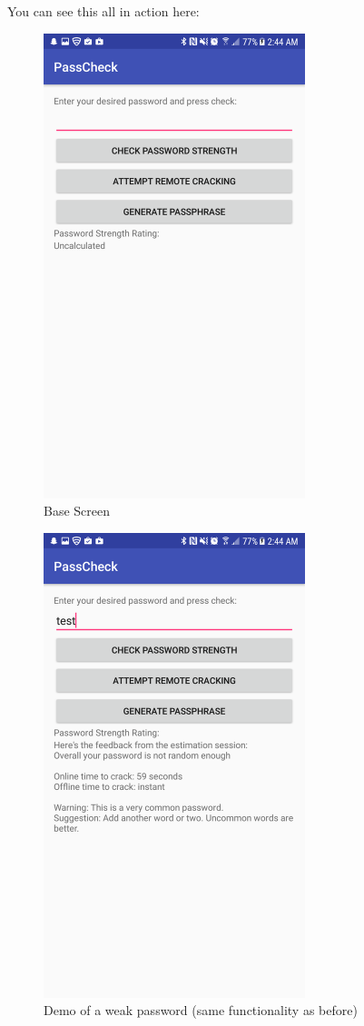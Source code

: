 \documentclass{article}
\begin{document}
You can see this all in action here:
\begin{figure}[ht]
      \includegraphics[width=3in]{img/t5s1.png}
      \centering
      \caption{Base Screen}
\end{figure}
\begin{figure}[ht]
      \includegraphics[width=3in]{img/t5s2.png}
      \centering
	\caption{Demo of a weak password (same functionality as before)}
\end{figure}
\end{document}
